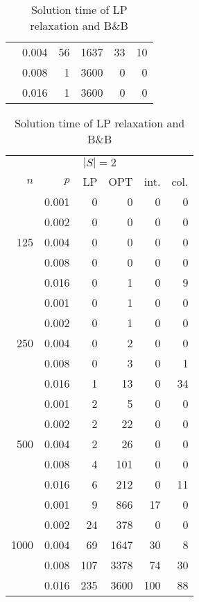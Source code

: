 \begin{table}[]
\begin{minipage}{.45\linewidth}
\begin{tabular}{rrrrrr}
 & 0.004 & 56  &1637& 33&10 \\
 & 0.008 &  1  &3600& 0 & 0 \\
 & 0.016 &  1  &3600& 0 & 0 
\end{tabular}
\end{minipage}
\hspace{1.5cm}
\begin{minipage}{.45\linewidth}
\begin{tabular}{rrrrrr}
\multicolumn{6}{c}{$|S|=2$}  \\
$n$ & $p$ & LP  & OPT & int. & col. \\
\hline
\multirow{5}{*}{125} 
& 0.001 &  0  &  0 &  0  &  0\\
& 0.002 &  0  &  0 &  0  &  0\\
& 0.004 &  0  &  0 &  0  &  0\\ 
& 0.008 &  0  &  0 &  0  &  0\\
& 0.016 &  0  &  1 &  0  &  9\\ 
\hline
\multirow{5}{*}{250} 
& 0.001 &  0  &  1 & 0   & 0 \\
& 0.002 &  0  &  1 & 0   & 0 \\
& 0.004 &  0  &  2 & 0   & 0 \\
& 0.008 &  0  &  3 & 0   & 1 \\
& 0.016 &  1  & 13 & 0   &34 \\
\hline
\multirow{5}{*}{500} 
& 0.001 &  2  &  5 & 0   & 0 \\
& 0.002 &  2  & 22 & 0   & 0 \\
& 0.004 &  2  & 26 & 0   & 0 \\
& 0.008 &  4  &101 & 0   & 0 \\
& 0.016 &  6  &212 & 0   &11 \\
\hline
\multirow{5}{*}{1000} 
& 0.001 &  9  &866   & 17 & 0  \\
& 0.002 &  24 &378   & 0  & 0  \\
& 0.004 &  69 &1647  & 30 & 8  \\
& 0.008 &  107&3378  & 74 &30  \\
& 0.016 &  235&3600  &100 &88 
\end{tabular}
\end{minipage}
\caption{Solution time of LP relaxation and B\&B}
\label{tab:soltime}
\end{table}
			  
